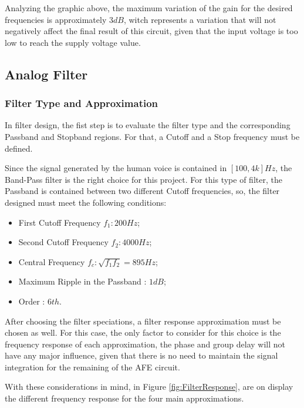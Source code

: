 Analyzing the graphic above, the maximum variation of the gain for the desired frequencies is approximately $3dB$, witch represents a variation that will not negatively affect the final result of this circuit, given that the input voltage is too low to reach the supply voltage value.

\subsection{Analog Filter}

\subsubsection{Filter Type and Approximation}

In filter design, the fist step is to evaluate the filter type and the corresponding Passband and Stopband regions. For that, a Cutoff and a Stop frequency must be defined.

Since the signal generated by the human voice is contained in $[100, 4k]Hz$, the Band-Pass filter is the right choice for this project. For this type of filter, the Passband is contained between two different Cutoff frequencies, so, the filter designed must meet the following conditions:

\begin{itemize}
    \item First Cutoff Frequency $f_1: 200Hz$;
    \item Second Cutoff Frequency $f_2: 4000Hz$;
    \item Central Frequency $f_c: \sqrt{f_1 f_2} = 895 Hz$;
    \item Maximum Ripple in the Passband : $1dB$;
    \item Order : $6th$.
\end{itemize}

After choosing the filter speciations, a filter response approximation must be chosen as well. For this case, the only factor to consider for this choice is the frequency response of each approximation, the phase and group delay will not have any major influence, given that there is no need to maintain the signal integration for the remaining of the AFE circuit.

With these considerations in mind, in Figure \ref{fig:FilterResponse}, are on display the different frequency response for the four main approximations.

